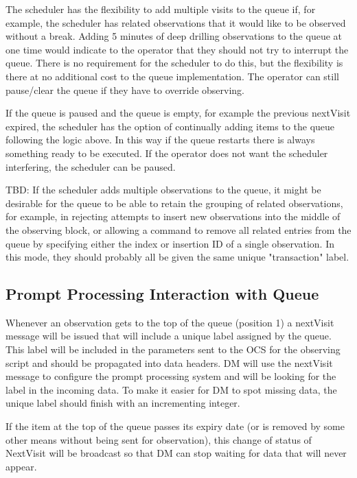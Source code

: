 \documentclass[TS,toc,lsstdraft]{lsstdoc}
\begin{document}
The scheduler has the flexibility to add multiple visits to the queue if, for example, the scheduler has related observations that it would like to be observed without a break.
Adding 5 minutes of deep drilling observations to the queue at one time would indicate to the operator that they should not try to interrupt the queue.
There is no requirement for the scheduler to do this, but the flexibility is there at no additional cost to the queue implementation.
The operator can still pause/clear the queue if they have to override observing.

If the queue is paused and the queue is empty, for example the previous nextVisit expired, the scheduler has the option of continually adding items to the queue following the logic above.
In this way if the queue restarts there is always something ready to be executed.
If the operator does not want the scheduler interfering, the scheduler can be paused.

TBD: If the scheduler adds multiple observations to the queue, it might be desirable for the queue to be able to retain the grouping of related observations, for example, in rejecting attempts to insert new observations into the middle of the observing block, or allowing a command to remove all related entries from the queue by specifying either the index or insertion ID of a single observation.
In this mode, they should probably all be given the same unique "transaction" label.

\subsection{Prompt Processing Interaction with Queue}

Whenever an observation gets to the top of the queue (position 1) a nextVisit message will be issued that will include a unique label assigned by the queue.
This label will be included in the parameters sent to the OCS for the observing script and should be propagated into data headers.
DM will use the nextVisit message to configure the prompt processing system and will be looking for the label in the incoming data.
To make it easier for DM to spot missing data, the unique label should finish with an incrementing integer.

If the item at the top of the queue passes its expiry date (or is removed by some other means without being sent for observation), this change of status of NextVisit will be broadcast so that DM can stop waiting for data that will never appear.
\end{document}
